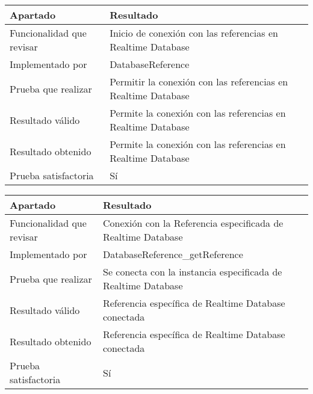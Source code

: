 \begin{center}
    \begin{tabulary}{0.8\textwidth}{L|L}
        \textbf{Apartado} & \textbf{Resultado} \\ \hline
        Funcionalidad que revisar & Inicio de conexión con las referencias en Realtime Database \\
        Implementado por & DatabaseReference \\
        Prueba que realizar & Permitir la conexión con las referencias en Realtime Database \\
        Resultado válido & Permite la conexión con las referencias en Realtime Database \\
        Resultado obtenido & Permite la conexión con las referencias en Realtime Database \\
        Prueba satisfactoria & Sí \\
    \end{tabulary} 
\end{center}

\bigskip

\begin{center}
    \begin{tabulary}{0.8\textwidth}{L|L}
        \textbf{Apartado} & \textbf{Resultado} \\ \hline
        Funcionalidad que revisar & Conexión con la Referencia especificada de Realtime Database \\
        Implementado por & DatabaseReference\_getReference \\
        Prueba que realizar & Se conecta con la instancia especificada de Realtime Database \\
        Resultado válido & Referencia específica de Realtime Database conectada \\
        Resultado obtenido & Referencia específica de Realtime Database conectada \\
        Prueba satisfactoria & Sí \\
    \end{tabulary} 
\end{center}

\bigskip

